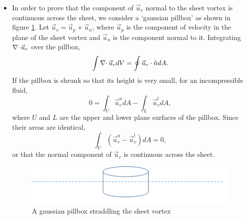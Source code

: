 \begin{itemize}
\item In order to prove that the component of $\vec{u}_v$ normal to the sheet vortex is continuous across the sheet, we consider a \enquote*{gaussian pillbox} as shown in figure 
\ref{c2f8}. Let $\vec{u}_v = \vec{u}_p + \vec{u}_n$, where $\vec{u}_p$ is the component of velocity in the plane of the sheet vortex and $\vec{u}_n$ is the component normal to it. 
Integrating $\operatorname{\nabla\cdot}{\vec{u}_v}$ over the pillbox,
\[
\int\operatorname{\nabla\cdot}{\vec{u}_v}dV = \oint\vec{u}_v\cdot\hat{n} dA.
\]
If the pillbox is shrunk so that its height is very small, for an incompressible fluid,
\[
0 = \int_{U} \vec{u}_v^{u} dA - \int_{L} \vec{u}_v^{l} dA,
\]
where $U$ and $L$ are the upper and lower plane surfaces of the pillbox. Since their areas are identical,
\[
\int_U (\vec{u}_v^{u} - \vec{u}_v^{l})dA = 0,
\]
or that the normal component of $\vec{u}_v$ is continuous across the sheet.
\begin{figure}[!ht]
\centering
\centerline{\includegraphics[scale=0.9]{c2f8}}
\caption{A gaussian pillbox straddling the sheet vortex}
\label{c2f8}
\end{figure}
\end{itemize}

